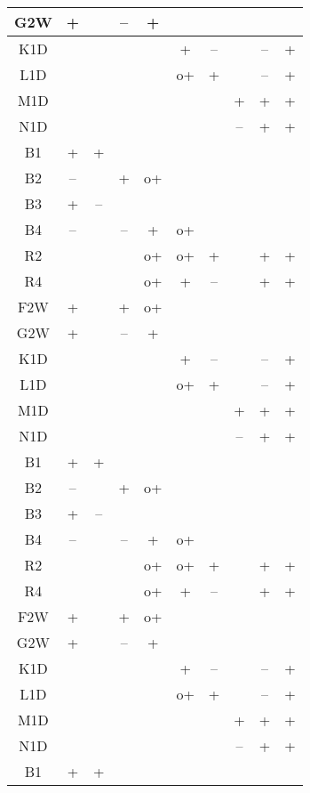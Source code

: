 \documentclass[a4paper,10pt]{report}
\begin{document}
\begin{longtable}{|c|c|c|c|c|c|c|c|c|c|}
		G2W & + &  & -- & + &  &  &  &  &  \\ \hline
		K1D &  &  &  &  & + & -- &  & -- & + \\ \hline
		L1D &  &  &  &  & o+ & + &  & -- & + \\ \hline
		M1D &  &  &  &  &  &  & + & + & + \\ \hline
		N1D &  &  &  &  &  &  & -- & + & + \\ \hline
		B1 & + & + &  &  &  &  &  &  &  \\ \hline
		B2 & -- &  & + & o+ &  &  &  &  &  \\ \hline
		B3 & + & -- &  &  &  &  &  &  &  \\ \hline
		B4 & -- &  & -- & + & o+ &  &  &  &  \\ \hline
		R2 &  &  &  & o+ & o+ & + &  & + & + \\ \hline
		R4 &  &  &  & o+ & + & -- &  & + & + \\ \hline
		F2W & + &  & + & o+ &  &  &  &  &  \\ \hline
		G2W & + &  & -- & + &  &  &  &  &  \\ \hline
		K1D &  &  &  &  & + & -- &  & -- & + \\ \hline
		L1D &  &  &  &  & o+ & + &  & -- & + \\ \hline
		M1D &  &  &  &  &  &  & + & + & + \\ \hline
		N1D &  &  &  &  &  &  & -- & + & + \\ \hline
		B1 & + & + &  &  &  &  &  &  &  \\ \hline
		B2 & -- &  & + & o+ &  &  &  &  &  \\ \hline
		B3 & + & -- &  &  &  &  &  &  &  \\ \hline
		B4 & -- &  & -- & + & o+ &  &  &  &  \\ \hline
		R2 &  &  &  & o+ & o+ & + &  & + & + \\ \hline
		R4 &  &  &  & o+ & + & -- &  & + & + \\ \hline
		F2W & + &  & + & o+ &  &  &  &  &  \\ \hline
		G2W & + &  & -- & + &  &  &  &  &  \\ \hline
		K1D &  &  &  &  & + & -- &  & -- & + \\ \hline
		L1D &  &  &  &  & o+ & + &  & -- & + \\ \hline
		M1D &  &  &  &  &  &  & + & + & + \\ \hline
		N1D &  &  &  &  &  &  & -- & + & + \\ \hline
		B1 & + & + &  &  &  &  &  &  &  \\ \hline

\end{longtable}
\end{document}
